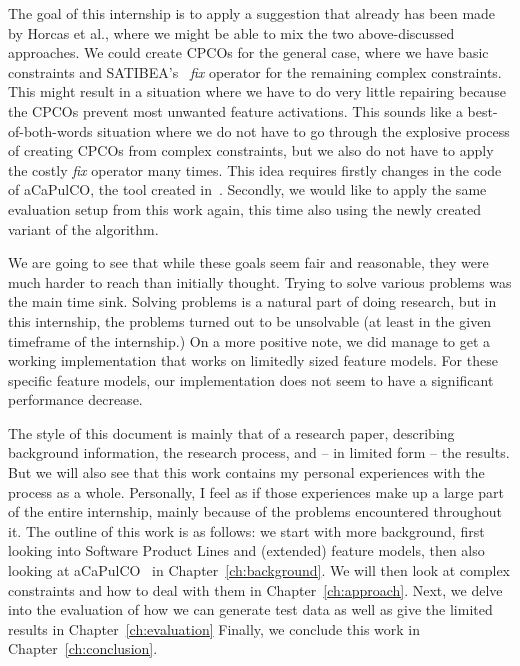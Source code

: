 The goal of this internship is to apply a suggestion that already has been made by 
Horcas et al., where we might be able to mix the two above-discussed 
approaches. We could create CPCOs for the general case, where we have basic 
constraints and SATIBEA's~\cite{henard2015satibea} \emph{fix} operator for the 
remaining complex constraints. This might result in a situation where we have 
to do very little repairing because the CPCOs prevent most unwanted feature 
activations. This sounds like a best-of-both-words situation where we do not 
have to go through the explosive process of creating CPCOs from complex 
constraints, but we also do not have to apply the costly \emph{fix} operator 
many times. This idea requires firstly changes in the code of aCaPulCO, the 
tool created in~\cite{horcas2022breakit}. Secondly, we would like to apply the
same evaluation setup from this work again, this time also using the newly created 
variant of the algorithm.

We are going to see that while these goals seem fair and reasonable, they were
much harder to reach than initially thought. Trying to solve various
problems was the main time sink. Solving problems is a natural part of doing
research, but in this internship, the problems turned out to be unsolvable (at
least in the given timeframe of the internship.) On a more positive note, we did
manage to get a working implementation that works on limitedly sized feature models.
For these specific feature models, our implementation does not seem to have a
significant performance decrease.

The style of this document is mainly that of a research paper, describing
background information, the research process, and -- in limited form -- the
results. But we will also see that this work contains my personal experiences
with the process as a whole. Personally, I feel as if those experiences make up
a large part of the entire internship, mainly because of the problems
encountered throughout it. The outline of this work is as follows:
we start with more background, first looking into Software Product Lines and
(extended) feature models, then also looking at aCaPulCO~\cite{horcas2022breakit}
in Chapter~\ref{ch:background}.
We will then look at complex constraints and how to deal with them in
Chapter~\ref{ch:approach}. Next, we delve into the evaluation of how we can
generate test data as well as give the limited results in
Chapter~\ref{ch:evaluation} Finally, we conclude this work in 
Chapter~\ref{ch:conclusion}.